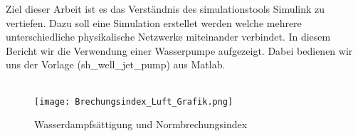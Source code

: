 Ziel dieser Arbeit ist es das Verständnis des simulationstools Simulink zu vertiefen. Dazu soll eine Simulation erstellet werden welche mehrere unterschiedliche physikalische Netzwerke miteinander verbindet. In diesem Bericht wir die Verwendung einer Wasserpumpe aufgezeigt. Dabei bedienen wir uns der Vorlage (sh\_well\_jet\_pump) aus Matlab.\\
\\

\begin{figure}[b]
\texttt{[image: Brechungsindex\_Luft\_Grafik.png]}
\caption{Wasserdampfsättigung und Normbrechungsindex}
\label{fig:Wasserdampfsättigung und Normbrechungsindex}
\end{figure}
